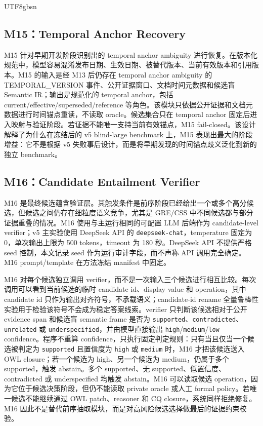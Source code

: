 \documentclass[11pt]{article}
\begin{document}
\begin{CJK*}{UTF8}{gbsn}
\subsection{M15：Temporal Anchor Recovery}

M15 针对早期开发阶段识别出的 temporal anchor ambiguity 进行恢复。在版本化规范中，模型容易混淆发布日期、生效日期、被替代版本、当前有效版本和引用版本。M15 的输入是经 M13 后仍存在 temporal anchor ambiguity 的 TEMPORAL\_VERSION 事件、公开证据窗口、文档时间元数据和候选盲 Semantic IR；输出是规范化的 temporal anchor，包括 current/effective/superseded/reference 等角色。该模块只依据公开证据和文档元数据进行时间锚点重读，不读取 oracle。候选集合只在 temporal anchor 固定后进入映射与验证阶段。若证据不能唯一支持当前有效锚点，M15 fail-closed。该设计解释了为什么在冻结后的 v5 blind-large benchmark 上，M15 表现出最大的阶段增益：它不是根据 v5 失败事后设计，而是将早期发现的时间锚点歧义泛化到新的独立 benchmark。

\subsection{M16：Candidate Entailment Verifier}

M16 是最终候选蕴含验证层。其触发条件是前序阶段已经给出一个或多个高分候选，但候选之间仍存在细粒度语义竞争，尤其是 GRE/CSS 中不同候选都与部分证据重叠的情况。M16 使用与主运行相同的可配置 LLM 后端作为 candidate-level verifier；v5 主实验使用 DeepSeek API 的 \texttt{deepseek-chat}，temperature 固定为 0，单次输出上限为 500 tokens，timeout 为 180 秒。DeepSeek API 不提供严格 seed 控制，本文记录 seed 作为运行审计字段，而不声称 API 调用完全确定。M16 prompt/template 在方法冻结 manifest 中固定。

M16 对每个候选独立调用 verifier，而不是一次输入三个候选进行相互比较。每次调用可以看到当前候选的临时 candidate id、display value 和 operation，其中 candidate id 只作为输出对齐符号，不承载语义；candidate-id rename 全量鲁棒性实验用于检验该符号不会成为稳定答案线索。verifier 只判断该候选相对于公开 evidence span 和候选盲 semantic frame 是否为 \texttt{supported}、\texttt{contradicted}、\texttt{unrelated} 或 \texttt{underspecified}，并由模型直接输出 \texttt{high}/\texttt{medium}/\texttt{low} confidence。程序不重算 confidence，只执行固定判定规则：只有当且仅当一个候选被判定为 \texttt{supported} 且置信度为 \texttt{high} 或 \texttt{medium} 时，M16 才把该候选送入 OWL closure；若一个候选为 high、另一个候选为 medium，仍属于多个 supported，触发 abstain。多个 supported、无 supported、低置信度、contradicted 或 underspecified 均触发 abstain。M16 可以读取候选 operation，因为它位于候选决策阶段，但仍不能读取 private oracle 或人工 formal policy。若唯一候选不能继续通过 OWL patch、reasoner 和 CQ closure，系统同样拒绝修复。M16 因此不是替代前序抽取模块，而是对高风险候选选择做最后的证据约束校验。


\end{CJK*}
\end{document}
